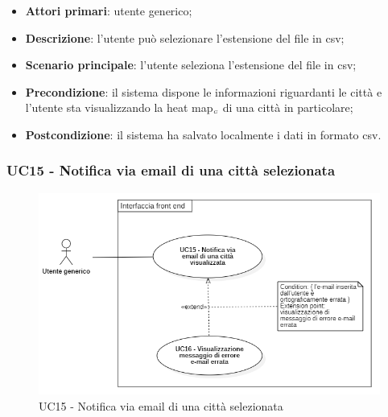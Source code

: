 \begin{itemize}
	\item \textbf{Attori primari}: utente generico;
	\item \textbf{Descrizione}: l’utente può selezionare l’estensione del file in csv;
	\item \textbf{Scenario principale}: l’utente seleziona l’estensione del file in csv;
	\item \textbf{Precondizione}: il sistema dispone le informazioni riguardanti le città e  l’utente sta visualizzando la heat map$_{\scaleto{G}{3pt}}$ di una città in particolare;
	\item \textbf{Postcondizione}: il sistema ha salvato localmente i dati in formato csv.
\end{itemize}

\subsubsection{UC15 - Notifica via email di una città selezionata}\label{CasiDUsoCasiDUsoFacoltativiTraUnUtenteEIlFrontEndElencoCasiDUsoUC15NotificaViaEmailDiUnaCittaSelezionata}

\begin{center}
	\begin{figure}[H]
		\centering\includegraphics[scale=0.7]{../immagini/attori_casi/uc15.png}
		\caption{UC15 - Notifica via email di una città selezionata}
	\end{figure}
\end{center}

